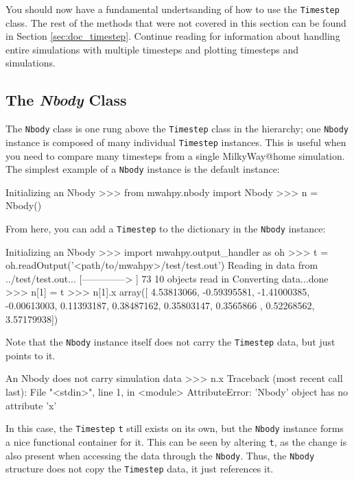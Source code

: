 \documentclass{article}
\begin{document}
You should now have a fundamental undertsanding of how to use the \verb!Timestep! class. The rest of the methods that were not covered in this section can be found in Section \ref{sec:doc_timestep}. Continue reading for information about handling entire simulations with multiple timesteps and plotting timesteps and simulations. 

\subsection{The \textit{Nbody} Class}

The \verb!Nbody! class is one rung above the \verb!Timestep! class in the \mwahpy hierarchy; one \verb!Nbody! instance is composed of many individual \verb!Timestep! instances. This is useful when you need to compare many timesteps from a single MilkyWay@home simulation. The simplest example of a \verb!Nbody! instance is the default instance:\\

\begin{codelisting}{Initializing an Nbody}
>>> from mwahpy.nbody import Nbody
>>> n = Nbody()
\end{codelisting}

From here, you can add a \verb!Timestep! to the dictionary in the \verb!Nbody! instance:\\

\begin{codelisting}{Initializing an Nbody}
>>> import mwahpy.output_handler as oh
>>> t = oh.readOutput('<path/to/mwahpy>/test/test.out')
Reading in data from ../test/test.out...
[-------------->     ] 73%
10 objects read in
Converting data...done
>>> n[1] = t
>>> n[1].x
array([ 4.53813066, -0.59395581, -1.41000385, -0.00613003,  0.11393187,
        0.38487162,  0.35803147,  0.3565866 ,  0.52268562,  3.57179938])
\end{codelisting}

Note that the \verb!Nbody! instance itself does not carry the \verb!Timestep! data, but just points to it. \\

\begin{codelisting}{An Nbody does not carry simulation data}
>>> n.x
Traceback (most recent call last):
  File "<stdin>", line 1, in <module>
AttributeError: 'Nbody' object has no attribute 'x'
\end{codelisting}

In this case, the \verb!Timestep! \verb!t! still exists on its own, but the \verb!Nbody! instance forms a nice functional container for it. This can be seen by altering \verb!t!, as the change is also present when accessing the data through the \verb!Nbody!. Thus, the \verb!Nbody! structure does not copy the \verb!Timestep! data, it just references it. \\
\end{document}
